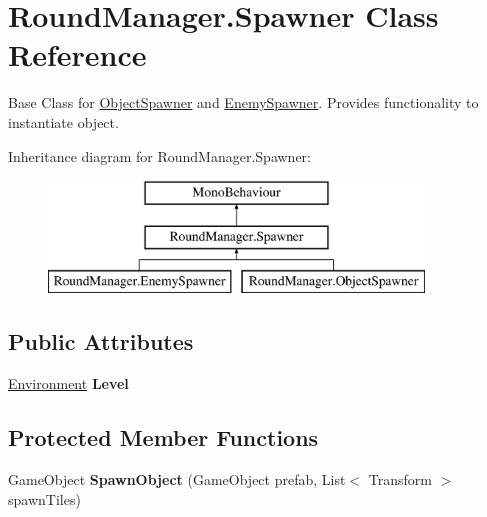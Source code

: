 \hypertarget{class_round_manager_1_1_spawner}{}\section{Round\+Manager.\+Spawner Class Reference}
\label{class_round_manager_1_1_spawner}


Base Class for \hyperlink{class_round_manager_1_1_object_spawner}{Object\+Spawner} and \hyperlink{class_round_manager_1_1_enemy_spawner}{Enemy\+Spawner}. Provides functionality to instantiate object.  


Inheritance diagram for Round\+Manager.\+Spawner\+:\begin{figure}[H]
\begin{center}
\leavevmode
\includegraphics[height=3.000000cm]{class_round_manager_1_1_spawner}
\end{center}
\end{figure}
\subsection*{Public Attributes}
\begin{DoxyCompactItemize}
\item 
\hypertarget{class_round_manager_1_1_spawner_a5eecafe8f24cfe78c048a44947f9faeb}{}\hyperlink{class_round_manager_1_1_environment}{Environment} {\bfseries Level}\label{class_round_manager_1_1_spawner_a5eecafe8f24cfe78c048a44947f9faeb}

\end{DoxyCompactItemize}
\subsection*{Protected Member Functions}
\begin{DoxyCompactItemize}
\item 
\hypertarget{class_round_manager_1_1_spawner_aba18f00b3729a1a4de4b7671da556f36}{}Game\+Object {\bfseries Spawn\+Object} (Game\+Object prefab, List$<$ Transform $>$ spawn\+Tiles)\label{class_round_manager_1_1_spawner_aba18f00b3729a1a4de4b7671da556f36}

\end{DoxyCompactItemize}


